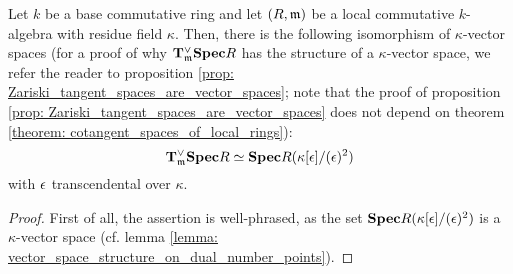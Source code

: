             \begin{theorem} \label{theorem: cotangent_spaces_of_local_rings}  
                Let $k$ be a base commutative ring and let $(R, \mathfrak{m})$ be a local commutative $k$-algebra with residue field $\kappa$. Then, there is the following isomorphism of $\kappa$-vector spaces (for a proof of why $\mathbf{T}^{\vee}_{\mathfrak{m}}\mathbf{Spec} R$ has the structure of a $\kappa$-vector space, we refer the reader to proposition \ref{prop: Zariski_tangent_spaces_are_vector_spaces}; note that the proof of proposition \ref{prop: Zariski_tangent_spaces_are_vector_spaces} does not depend on theorem \ref{theorem: cotangent_spaces_of_local_rings}):
                    $$\mathbf{T}^{\vee}_{\mathfrak{m}}\mathbf{Spec} R \simeq \mathbf{Spec} R(\kappa[\epsilon]/(\epsilon)^2)$$
                with $\epsilon$ transcendental over $\kappa$.
            \end{theorem}
                \begin{proof}
                    First of all, the assertion is well-phrased, as the set $\mathbf{Spec} R(\kappa[\epsilon]/(\epsilon)^2)$ is a $\kappa$-vector space (cf. lemma \ref{lemma: vector_space_structure_on_dual_number_points}). 
                \end{proof}
